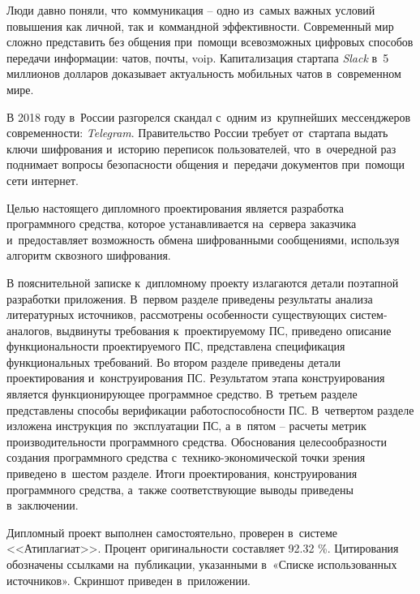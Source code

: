   
\printglossaries


Люди давно поняли, что~коммуникация -- одно из~самых важных условий повышения как личной, так и~коммандной эффективности. Современный мир сложно представить без общения при~помощи всевозможных цифровых способов передачи информации: чатов, почты, \gls{voip}. Капитализация стартапа \textit{Slack} в~5 миллионов долларов\cite{slack:capitalization} доказывает актуальность мобильных чатов в~современном мире.

В 2018 году в~России разгорелся скандал с~одним из~крупнейших мессенджеров современности: \textit{Telegram}. Правительство России требует от~стартапа выдать ключи шифрования и~историю переписок пользователей, что~в~очередной раз поднимает вопросы безопасности общения и~передачи документов при~помощи сети интернет\cite{telegram:vs:rkn}.

Целью настоящего дипломного проектирования является разработка программного средства, которое устанавливается на~сервера заказчика и~предоставляет возможность обмена шифрованными сообщениями, используя алгоритм сквозного шифрования.

В пояснительной записке к~дипломному проекту излагаются детали поэтапной разработки приложения. В~первом разделе приведены результаты анализа литературных источников, рассмотрены особенности существующих систем-аналогов, выдвинуты требования к~проектируемому ПС, приведено описание функциональности проектируемого ПС, представлена спецификация функциональных требований. Во втором разделе приведены детали проектирования и~конструирования ПС. Результатом этапа конструирования является функционирующее программное средство. В~третьем разделе представлены способы верификации работоспособности ПС. В~четвертом разделе изложена инструкция по~эксплуатации ПС, а~в~пятом -- расчеты метрик производительности программного средства. Обоснования целесообразности создания программного средства с~технико-экономической точки зрения приведено в~шестом разделе. Итоги проектирования, конструирования программного средства, а~также соответствующие выводы приведены в~заключении.

Дипломный проект выполнен самостоятельно, проверен в~системе <<Атиплагиат>>. Процент оригинальности составляет \num{92.32} \%. Цитирования обозначены ссылками на~публикации, указанными в~«Списке использованных источников».
Скриншот приведен в~приложении.